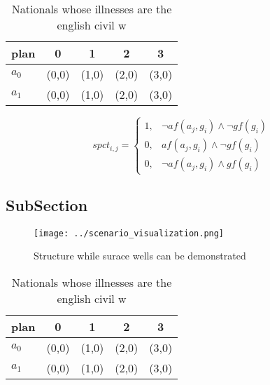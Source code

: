 \documentclass[a4paper]{article}
\begin{document}
\begin{table}
\begin{adjustbox}{width=0.8\columnwidth}
\begin{tabular}{|l|l|l|l|l|}
\hline
\textbf{plan} & \multicolumn{1}{c|}{\textbf{0}} & \multicolumn{1}{c|}{\textbf{1}} & \multicolumn{1}{c|}{\textbf{2}} & \multicolumn{1}{c|}{\textbf{3}} \\ \hline
\textbf{$a_0$}  & (0,0) & (1,0) & (2,0) & (3,0) \\ \hline
\textbf{$a_1$}  & (0,0) & (1,0) & (2,0) & (3,0) \\ \hline
\end{tabular}
\end{adjustbox}
\caption{Nationals whose illnesses are the english civil w
}
\end{table}

\begin{equation}
spct_{i,j} =
\begin{cases}
1, & \text{$\neg af(a_j,g_i) \wedge \neg gf(g_i)$}\\
0, & \text{$af(a_j,g_i) \wedge \neg gf(g_i)$}\\
0, & \text{$\neg af(a_j,g_i) \wedge gf(g_i)$}
\end{cases}
\end{equation}

\subsection{SubSection}

\begin{figure}
\centering
\texttt{[image: ../scenario\_visualization.png]}
\caption{Structure while surace wells can be demonstrated 
}
\end{figure}
 
\begin{table}
\begin{adjustbox}{width=0.8\columnwidth}
\begin{tabular}{|l|l|l|l|l|}
\hline
\textbf{plan} & \multicolumn{1}{c|}{\textbf{0}} & \multicolumn{1}{c|}{\textbf{1}} & \multicolumn{1}{c|}{\textbf{2}} & \multicolumn{1}{c|}{\textbf{3}} \\ \hline
\textbf{$a_0$}  & (0,0) & (1,0) & (2,0) & (3,0) \\ \hline
\textbf{$a_1$}  & (0,0) & (1,0) & (2,0) & (3,0) \\ \hline
\end{tabular}
\end{adjustbox}
\caption{Nationals whose illnesses are the english civil w
}
\end{table}
\end{document}
